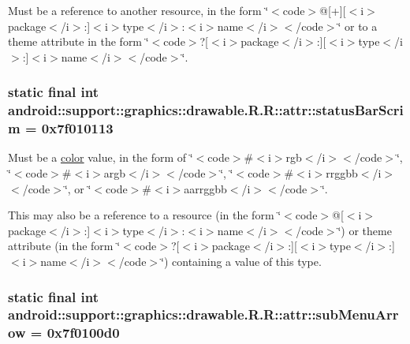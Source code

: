 Must be a reference to another resource, in the form \char`\"{}$<$code$>$@\mbox{[}+\mbox{]}\mbox{[}$<$i$>$package$<$/i$>$:\mbox{]}$<$i$>$type$<$/i$>$:$<$i$>$name$<$/i$>$$<$/code$>$\char`\"{} or to a theme attribute in the form \char`\"{}$<$code$>$?\mbox{[}$<$i$>$package$<$/i$>$:\mbox{]}\mbox{[}$<$i$>$type$<$/i$>$:\mbox{]}$<$i$>$name$<$/i$>$$<$/code$>$\char`\"{}. \hypertarget{classandroid_1_1support_1_1graphics_1_1drawable_1_1_r_1_1attr_7b23faf79ec389b5f3afe4441724b675}{
\subsubsection[{statusBarScrim}]{\setlength{\rightskip}{0pt plus 5cm}static final int android::support::graphics::drawable.R.R::attr::statusBarScrim = 0x7f010113}}
\label{classandroid_1_1support_1_1graphics_1_1drawable_1_1_r_1_1attr_7b23faf79ec389b5f3afe4441724b675}


Must be a \hyperlink{classandroid_1_1support_1_1graphics_1_1drawable_1_1_r_1_1color}{color} value, in the form of \char`\"{}$<$code$>$\#$<$i$>$rgb$<$/i$>$$<$/code$>$\char`\"{}, \char`\"{}$<$code$>$\#$<$i$>$argb$<$/i$>$$<$/code$>$\char`\"{}, \char`\"{}$<$code$>$\#$<$i$>$rrggbb$<$/i$>$$<$/code$>$\char`\"{}, or \char`\"{}$<$code$>$\#$<$i$>$aarrggbb$<$/i$>$$<$/code$>$\char`\"{}. 

This may also be a reference to a resource (in the form \char`\"{}$<$code$>$@\mbox{[}$<$i$>$package$<$/i$>$:\mbox{]}$<$i$>$type$<$/i$>$:$<$i$>$name$<$/i$>$$<$/code$>$\char`\"{}) or theme attribute (in the form \char`\"{}$<$code$>$?\mbox{[}$<$i$>$package$<$/i$>$:\mbox{]}\mbox{[}$<$i$>$type$<$/i$>$:\mbox{]}$<$i$>$name$<$/i$>$$<$/code$>$\char`\"{}) containing a value of this type. \hypertarget{classandroid_1_1support_1_1graphics_1_1drawable_1_1_r_1_1attr_38cb0a5ccad2334571816af2f2ad85dc}{
\subsubsection[{subMenuArrow}]{\setlength{\rightskip}{0pt plus 5cm}static final int android::support::graphics::drawable.R.R::attr::subMenuArrow = 0x7f0100d0}}
\label{classandroid_1_1support_1_1graphics_1_1drawable_1_1_r_1_1attr_38cb0a5ccad2334571816af2f2ad85dc}


